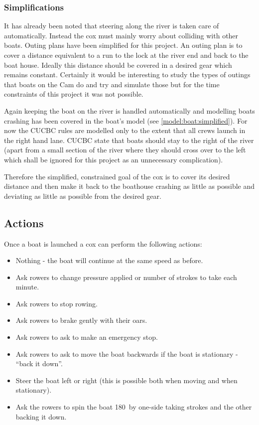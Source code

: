       \subsubsection{Simplifications} \label{model:cox:goals:simplifications}
      It has already been noted that steering along the river is taken care of automatically. Instead the cox must mainly worry about colliding with other boats. Outing plans have been simplified for this project. An outing plan is to cover a distance equivalent to a run to the lock at the river end and back to the boat house. Ideally this distance should be covered in a desired gear which remains constant. Certainly it would be interesting to study the types of outings that boats on the Cam do and try and simulate those but for the time constraints of this project it was not possible.
      
      Again keeping the boat on the river is handled automatically and modelling boats crashing has been covered in the boat's model (see \ref{model:boat:simplified}). For now the CUCBC rules are modelled only to the extent that all crews launch in the right hand lane. CUCBC state that boats should stay to the right of the river (apart from a small section of the river where they should cross over to the left which shall be ignored for this project as an unnecessary complication).
      
      Therefore the simplified, constrained goal of the cox is to cover its desired distance and then make it back to the boathouse crashing as little as possible and deviating as little as possible from the desired gear.

      \subsection{Actions} \label{model:cox:actions}
      Once a boat is launched a cox can perform the following actions:
      \begin{itemize}
        \item Nothing - the boat will continue at the same speed as before.
        \item Ask rowers to change pressure applied or number of
          strokes to take each minute.
        \item Ask rowers to stop rowing.
        \item Ask rowers to brake gently with their oars.
        \item Ask rowers to ask to make an emergency stop.
        \item Ask rowers to ask to move the boat backwards if the boat
          is stationary - ``back it down''.
        \item Steer the boat left or right (this is possible both when moving and when stationary).
        \item Ask the rowers to spin the boat 180\textdegree\ by
          one-side taking strokes and the other backing it down.
      \end{itemize}
      
